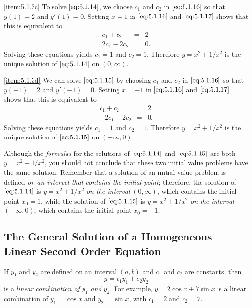 \documentclass{ximera}
\begin{document}
\begin{example}
\begin{explanation}
\ref{item:5.1.3c}
To solve
$\eqref{eq:5.1.14}$, we choose $c_1$ and $c_2$ in $\eqref{eq:5.1.16}$
so that $y(1)=2$ and $y'(1)=0$. Setting $x=1$ in $\eqref{eq:5.1.16}$
and $\eqref{eq:5.1.17}$ shows that this is equivalent to
\begin{eqnarray*}
c_1+c_2&=&2\\
2c_1-2c_2&=&0.
\end{eqnarray*}
Solving these equations yields  $c_1=1$  and $c_2=1$.
Therefore $y=x^2+1/x^2$ is the unique  solution of $\eqref{eq:5.1.14}$
on $(0,\infty)$.
 
\ref{item:5.1.3d}
We can solve
$\eqref{eq:5.1.15}$ by choosing $c_1$ and $c_2$ in $\eqref{eq:5.1.16}$
so that $y(-1)=2$ and $y'(-1)=0$. Setting $x=-1$ in $\eqref{eq:5.1.16}$
and $\eqref{eq:5.1.17}$ shows that this is equivalent to
\begin{eqnarray*}
c_1+c_2&=&2\\
-2c_1+2c_2&=&0.
\end{eqnarray*}
Solving these equations yields  $c_1=1$  and $c_2=1$.
Therefore $y=x^2+1/x^2$ is the unique solution of $\eqref{eq:5.1.15}$
on $(-\infty,0)$.
 
\end{explanation}
\end{example}
 
 
 
Although the \textit{formulas} for the solutions of $\eqref{eq:5.1.14}$ and
$\eqref{eq:5.1.15}$ are both $y=x^2+1/x^2$, you should not conclude that
these two initial value problems have the same solution. Remember that
a solution of an initial value problem is defined \textit{on an interval
that contains the initial point};  therefore, the solution of
$\eqref{eq:5.1.14}$ is $y=x^2+1/x^2$ \textit{on the interval} $(0,\infty)$,
which contains the initial point $x_0=1$, while the solution of
$\eqref{eq:5.1.15}$ is $y=x^2+1/x^2$ \textit{on the interval} $(-\infty,0)$,
which contains the initial point $x_0=-1$.
 
\subsection*{The General Solution of a Homogeneous Linear Second Order
Equation}
 
If $y_1$ and $y_2$ are defined on an interval
$(a,b)$ and $c_1$ and $c_2$ are constants, then
$$
y=c_1y_1+c_2y_2
$$
is a \textit{linear combination of $y_1$ and $y_2$}. For
example, $y=2\cos x+7 \sin x$ is a linear combination of $y_1=
\cos x$ and $y_2=\sin x$, with $c_1=2$ and $c_2=7$.
 
\end{document}
